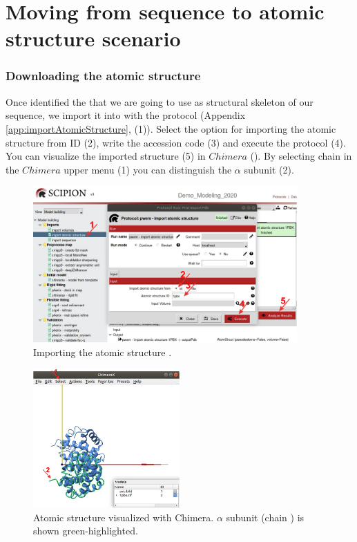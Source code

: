\section{Moving from sequence to atomic structure scenario}

\subsubsection*{Downloading the atomic structure}
  
  Once identified the  that we are going to use as structural skeleton of our sequence, we import it into \scipion with the protocol  (Appendix \ref{app:importAtomicStructure},   (1)). Select the option for importing the atomic structure from ID (2), write the  accession code (3) and execute the protocol (4). You can visualize the imported structure (5) in $Chimera$ (). By selecting chain  in the $Chimera$ upper menu (1) you can distinguish the  $\alpha$ subunit (2).
  
  \begin{figure}[H]
  \centering 
  \captionsetup{width=.7\linewidth} 
  \includegraphics[width=0.90\textwidth]{Images/Fig10}
  \caption{Importing the atomic structure .}
  \label{fig:import_atomic_structure}
  \end{figure}
  
  \begin{figure}[H]
  \centering 
  \captionsetup{width=.7\linewidth} 
  \includegraphics[width=0.50\textwidth]{Images/Fig11}
  \caption{Atomic structure  visualized with Chimera.  $\alpha$ subunit (chain ) is shown green-highlighted.}
  \label{fig:chimera_visualization_structure}
  \end{figure}
  
